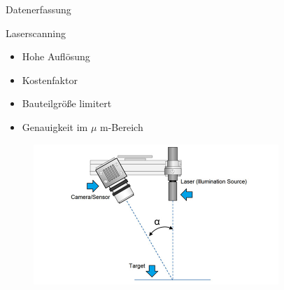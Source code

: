 \documentclass[../slides.tex]{subfiles}
\begin{document}
\begin{frame}{Datenerfassung}
    \begin{minipage}[t]{.5\textwidth}
        \begin{block}{Laserscanning}
            \begin{itemize}
                \item Hohe Auflösung
                \item Kostenfaktor
                \item Bauteilgröße limitert
                \item Genauigkeit im $\mu$ m-Bereich
            \end{itemize}
        \end{block}
        \end{minipage}
        \hfill
        \begin{minipage}[t]{.49\textwidth}
        \begin{figure}[]
            \includegraphics[height=150pt]{img_niklas/laser_1.jpg}
            \caption{}
            \label{fig:laserscanner}
        \end{figure}
        \end{minipage}
    \end{frame}
\end{document}
